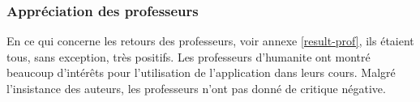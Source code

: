 \subsubsection{Appréciation des professeurs}
En ce qui concerne les retours des professeurs, voir annexe \ref{result-prof}, ils étaient tous, sans exception, très positifs. Les professeurs d'\gls{humanite} ont montré beaucoup d'intérêts pour l'utilisation de l'application dans leurs cours. Malgré l'insistance des auteurs, les professeurs n'ont pas donné de critique négative.
